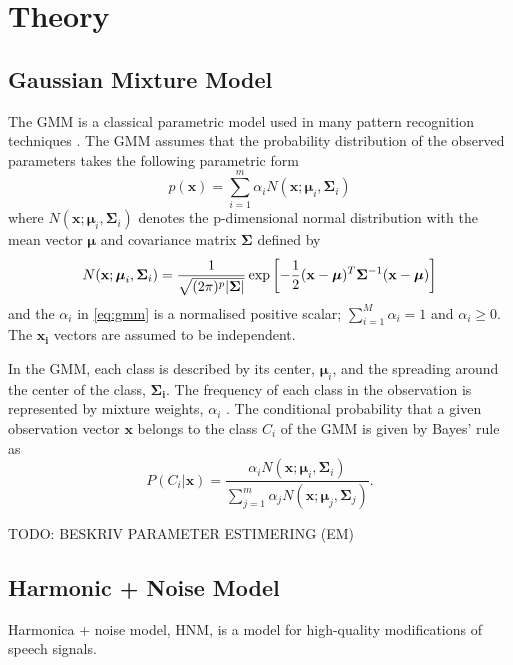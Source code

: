\chapter{Theory} %
\label{cha:theory}
\section{Gaussian Mixture Model} %
\label{sec:gaussian_mixture_model}
The GMM is a classical parametric model used in many pattern recognition techniques \cite{stylianou98}. The GMM assumes that the probability distribution of the observed parameters takes the following parametric form
\begin{equation}
	\label{eq:gmm}
	p(\mathbf{x}) = \sum_{i=1}^{m} \alpha_i N(\mathbf{x}; \boldsymbol{\mu}_i, \mathbf{\Sigma}_i)
\end{equation}
where $N(\mathbf{x}; \mathbf{\mu}_i, \mathbf{\Sigma}_i)$ denotes the p-dimensional normal distribution with the mean vector $\boldsymbol{\mu}$ and covariance matrix $\mathbf{\Sigma}$ defined by
\begin{equation}
	N(\mathbf{x}; \boldsymbol{\mu}_i, \mathbf{\Sigma}_i) = \frac{1}{\sqrt{(2\pi)^p\lvert\mathbf{\Sigma}\rvert}} \exp\left[ -\frac{1}{2} (\mathbf{x} -\boldsymbol{\mu})^T \mathbf{\Sigma}^{-1} (\mathbf{x} -\boldsymbol{\mu})\right]
\end{equation}
and the $\alpha_i$ in \eqref{eq:gmm} is a normalised positive scalar; $\sum_{i=1}^{M}\alpha_i = 1$ and $\alpha_i \geq 0$. The $\mathbf{x_i}$ vectors are assumed to be independent.

In the GMM, each class is described by its center, $\boldsymbol{\mu}_i$, and the spreading around the center of the class, $\mathbf{\Sigma_i}$. The frequency of each class in the observation is represented by mixture weights, $\alpha_i$ \cite{stylianou98}. The conditional probability that a given observation vector $\mathbf{x}$ belongs to the class $C_i$ of the GMM is given by Bayes' rule \cite{statistikk} as
\begin{equation}
	\label{eq:bayes}
	P(C_i\vert \mathbf{x}) = \frac{\alpha_i N(\mathbf{x}; \boldsymbol{\mu}_i, \mathbf{\Sigma}_i)}{\sum_{j=1}^{m}\alpha_j N(\mathbf{x}; \boldsymbol{\mu}_j, \mathbf{\Sigma}_j)}.
\end{equation}

TODO: BESKRIV PARAMETER ESTIMERING (EM)

\section{Harmonic + Noise Model} %
\label{sec:harmonic_noise_model}
Harmonica + noise model, HNM, is a model for high-quality modifications of speech signals.

